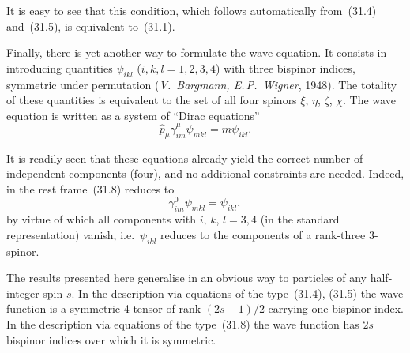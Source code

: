 It is easy to see that this condition, which follows automatically from~(31.4) and~(31.5), is equivalent to~(31.1).

Finally, there is yet another way to formulate the wave equation. It consists in introducing quantities $\psi_{ikl}$ ($i, k, l = 1, 2, 3, 4$) with three bispinor indices, symmetric under permutation (\emph{V.~Bargmann, E.\,P.~Wigner}, 1948). The totality of these quantities is equivalent to the set of all four spinors $\xi$, $\eta$, $\zeta$, $\chi$. The wave equation is written as a system of ``Dirac equations''
\begin{equation}
\widehat p_\mu\gamma^\mu_{im}\psi_{mkl} = m\psi_{ikl}.
\tag{31.8}
\end{equation}

It is readily seen that these equations already yield the correct number of independent components (four), and no additional constraints are needed. Indeed, in the rest frame~(31.8) reduces to
\[
\gamma^0_{im}\psi_{mkl} = \psi_{ikl},
\]
by virtue of which all components with $i$, $k$, $l = 3, 4$ (in the standard representation) vanish, i.e.\ $\psi_{ikl}$ reduces to the components of a rank-three 3-spinor.

The results presented here generalise in an obvious way to particles of any half-integer spin $s$. In the description via equations of the type~(31.4), (31.5) the wave function is a symmetric 4-tensor of rank $(2s-1)/2$ carrying one bispinor index. In the description via equations of the type~(31.8) the wave function has $2s$ bispinor indices over which it is symmetric.
